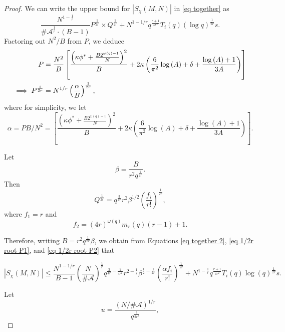 \documentclass[12pt]{amsart}
\theoremstyle{plain}
\theoremstyle{definition}
\newcommand{\cA}{{\mathcal{A}}}
\begin{document}
\begin{proof}
We can write the upper bound for $|S_\chi(M, N)|$ in \eqref{eq together} as 
\begin{equation}
\label{eq together 2}
    \frac{N^{1-\frac{1}{r}}}{\#\cA^{\frac{1}{r}}\cdot (B-1)}P^{\frac{1}{2r}}\times
     Q^{\frac{1}{2r}}
    +
    N^{1-1/r}q^{\frac{r+1}{4r^2}}T_i(q)\left(\log q\right)^{\frac{1}{2r}}s.
\end{equation}
Factoring out $N^2/B$ from $P$, we deduce
\begin{align}
\label{eq 1/2r root P1}
    P
    &=
    \frac{N^2}{B}\left[ \frac{\left(\kappa\phi^*+\frac{B2^{\omega(q)-1}}{N} \right)^2}{B}
    +
    2\kappa\left(\frac{6}{\pi^2}\log{(A)}+\delta+\frac{\log{(A)}+1}{3A}\right)\right]
    \\
    \implies 
    P^{\frac{1}{2r}}
    &=
    N^{1/r}\left(\frac{\alpha}{B}\right)^{\frac{1}{2r}},\notag
\end{align}
where for simplicity, we let
\begin{equation}\label{eq alpha}
    \alpha
    =
    PB/N^2
    =
    \left[ \frac{\left(\kappa\phi^*+\frac{B2^{\omega(q)-1}}{N} \right)^2}{B}
    +
    2\kappa\left(\frac{6}{\pi^2}\log{(A)}+\delta+\frac{\log{(A)}+1}{3A}\right)\right].
\end{equation}

Let $$\beta = \frac{B}{r^2 q^{\frac{1}{2r}}}.$$
Then 
\begin{equation}
\label{eq 1/2r root P2}
    Q^{\frac{1}{2r}}=   q^{\frac{3}{4r}}r^{2}\beta^{1/2}\left(\frac{f_i}{r!}\right)^{\frac{1}{2r}},
\end{equation}
where
$f_1 = r$ and 
$$f_2 = (4r)^{\omega(q)}m_r(q)(r-1)+1.$$

Therefore, writing $B = r^2q^{\frac{1}{2r}}\beta$, we obtain from Equations \eqref{eq together 2}, \eqref{eq 1/2r root P1}, and \eqref{eq 1/2r root P2} that

\begin{equation}\label{helpful intermediate}
    \left| S_\chi(M, N) \right|
    \le
    \frac{N^{1-1/r}}{B-1}\left(\frac{N}{\#\cA}\right)^{\frac{1}{r}}q^{\frac{3}{4r}-\frac{1}{4r^2}}r^{2-\frac{1}{r}}\beta^{\frac{1}{2}-\frac{1}{2r}}\left(\frac{\alpha f_i}{r!}\right)^{\frac{1}{2r}}
        +N^{1-\frac{1}{r}}q^{\frac{r+1}{4r^2}}T_i(q)\log(q)^{\frac{1}{2r}}s.     
\end{equation}

Let
\begin{equation}\label{eq u}
u=\frac{\left(N/\#\cA\right)^{1/{r}}}{q^{\frac{1}{2r^2}}},
\end{equation}


\end{proof}
\end{document}
